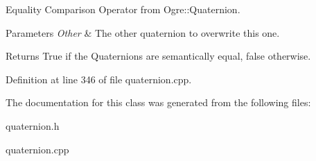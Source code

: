 Equality Comparison Operator from Ogre::Quaternion. 


\begin{DoxyParams}{Parameters}
{\em Other} & The other quaternion to overwrite this one. \\
\hline
\end{DoxyParams}
\begin{DoxyReturn}{Returns}
True if the Quaternions are semantically equal, false otherwise. 
\end{DoxyReturn}


Definition at line 346 of file quaternion.cpp.



The documentation for this class was generated from the following files:\begin{DoxyCompactItemize}
\item 
quaternion.h\item 
quaternion.cpp\end{DoxyCompactItemize}
